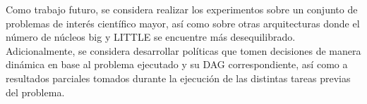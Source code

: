 Como trabajo futuro, se considera realizar los experimentos sobre un
conjunto de problemas de interés científico mayor, así como sobre otras
arquitecturas donde el número de núcleos big y LITTLE se encuentre más
desequilibrado. Adicionalmente, se considera desarrollar políticas que
tomen decisiones de manera dinámica en base al problema ejecutado y su DAG
correspondiente, así como a resultados parciales tomados durante la
ejecución de las distintas tareas previas del problema.



